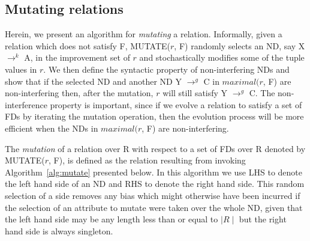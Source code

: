 \subsection{Mutating relations}
\label{sec:mutate}

Herein, we present an algorithm for {\em mutating} a relation.
Informally, given a relation which does not satisfy F, MUTATE($r$, F) 
randomly selects an ND, say X $\to^k$ A, in the improvement set of $r$ and 
stochastically modifies some of the tuple values in $r$.
We then define the syntactic property of non-interfering NDs 
and show that if the selected ND and another ND
Y $\to^g$ C in $maximal(r$, F) are non-interfering then, after the mutation, 
$r$ will still satisfy Y $\to^g$ C.
The non-interference property is important,
since if we evolve a relation to satisfy a set of FDs by iterating the
mutation operation, then the evolution process will be more efficient 
when the NDs in $maximal(r$, F) are non-interfering.

\medskip

The {\em mutation} of a relation over R with respect to a set of FDs over R 
denoted by MUTATE($r$, F), is defined as the relation resulting from invoking 
Algorithm~\ref{alg:mutate} presented below. In this algorithm we use LHS
 to denote the left hand side of an ND and RHS to denote the right hand
side.  This random selection of a side removes any bias which might otherwise
have been incurred if the selection of an attribute to mutate were
taken over the whole ND, given that the left hand side may be any
length less than or equal to $\mid R \mid$ but the right hand side is always singleton.


